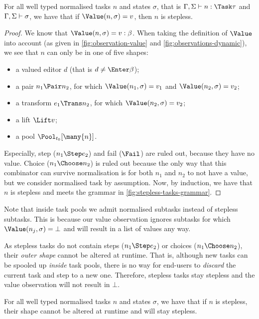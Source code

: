 \begin{proposition}
  \label{prp:valued-means-stepless}
  For all well typed normalised tasks $n$ and states $\sigma$,
  that is $\Gamma,\Sigma \infers n:\Task\tau$ and $\Gamma,\Sigma \vdash \sigma$,
  we have that
    if $\Value(n,\sigma) = v$,
    then $n$ is stepless.
\end{proposition}
\begin{proof}
  We know that $\Value(n,\sigma) = v : \beta$.
  When taking the definition of $\Value$ into account (as given in \cref{fig:observation-value} and \cref{fig:observations-dynamic}),
  we see that $n$ can only be in one of five shapes:
  \begin{itemize}
    \item a valued editor $d$ (that is $d \neq \Enter\beta$);
    \item a pair $n_1 \Pair n_2$, for which $\Value(n_1,\sigma) = v_1$ and $\Value(n_2,\sigma) = v_2$;
    \item a transform $e_1 \Trans n_2$, for which $\Value(n_2,\sigma) = v_2$;
    \item a lift $\Lift v$;
    \item a pool $\Pool_{t_0} [\many{n}]$.
  \end{itemize}
  Especially, step ($n_1 \Step e_2$) and fail ($\Fail$) are ruled out, because they have no value.
  Choice ($n_1 \Choose n_2$) is ruled out
  because the only way that this combinator can survive normalisation is for both $n_1$ and $n_2$ to not have a value,
  but we consider normalised task by assumption.
  Now, by induction, we have that $n$ is stepless and meets the grammar in \cref{fig:stepless-tasks-grammar}.
\end{proof}

Note that inside task pools we admit normalised subtasks instead of stepless subtasks.
This is because our value observation ignores subtasks for which $\Value(n_j,\sigma) = \bot$
and will result in a list of values any way.

As stepless tasks do not contain steps ($n_1 \Step e_2$) or choices ($n_1 \Choose n_2$),
their \emph{outer shape} cannot be altered at runtime.
That is, although new tasks can be spooled up \emph{inside} task pools,
there is no way for end-users to \emph{discard} the current task
and step to a new one.
Therefore, stepless tasks stay stepless and the value observation will not result in $\bot$.

\begin{corollary}
  \label{cor:stepless-stays-stepless}
  For all well typed normalised tasks $n$ and states $\sigma$,
  we have that
    if $n$ is stepless,
    their shape cannot be altered at runtime
    and will stay stepless.
\end{corollary}

